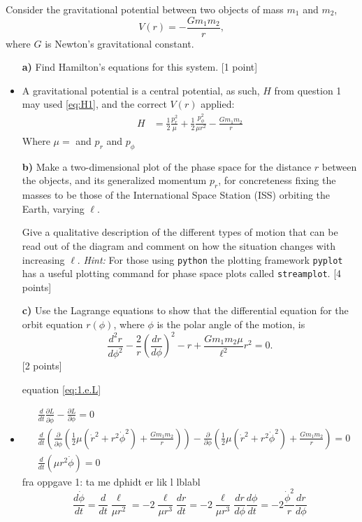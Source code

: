 \documentclass[11pt,a4paper]{report}
\newcounter{excount}[chapter]
\newenvironment{exercise}[1][]{\addtocounter{excount}{1} \noindent {\bf Question
    \arabic{excount} \ \ #1}\hspace{2mm}}{\vspace{4mm}}
\begin{document}
\begin{exercise}{\bf Orbital motion\\}
Consider the gravitational potential between two objects of mass $m_1$ and $m_2$,
\begin{equation}
V(r)=-\frac{Gm_1m_2}{r},\label{eq:grav_pot}
\end{equation}
where $G$ is Newton's gravitational constant.
\begin{itemize}
\item[{\bf a)}] Find Hamilton's equations for this system. [1 point]
\item A gravitational potential is a central potential, as such, $H$ from question 1 may used \eqref{eq:H1}, and the correct $V(r)$ applied:
\begin{align}
H &=  \frac{1}{2} \frac{p_r^2}{\mu}  +\frac{1}{2}\frac{p_\phi^2}{\mu r^2}  -\frac{Gm_1m_2}{r}
\label{eq:2.a.H}
\end{align}
Where $\mu=$ and $p_r$ and $p_\phi$
 \item[{\bf b)}] Make a two-dimensional plot of the phase space for the distance $r$ between the objects, and its generalized momentum $p_r$, for concreteness fixing the masses to be those of the International Space Station (ISS) orbiting the Earth, varying $\ell$.

Give a qualitative description of the different types of motion that can be read out of the diagram and comment on how the situation changes with increasing $\ell$. {\it Hint:} For those using {\tt python} the plotting framework {\tt pyplot} has a useful plotting command for phase space plots called {\tt streamplot}.  [4 points]
\item[{\bf c)}] Use the Lagrange equations to show that the differential equation for the orbit equation $r(\phi)$, where $\phi$ is the polar angle of the motion, is
\begin{equation}
\frac{d^2r}{d\phi^2}-\frac{2}{ r}\left(\frac{dr}{d\phi}\right)^2-r+\frac{Gm_1m_2\mu }{\ell^2}r^2=0. \label{eq:2c.diffeq}
\end{equation}
[2 points]

equation \eqref{eq:1.e.L}
\item \begin{align}
&\frac{d}{dt}\frac{\partial L}{\partial \dot{\phi}}-\frac{\partial L}{\partial \phi}=0 \\
&\frac{d}{dt} \left( \frac{\partial }{\partial \dot{\phi}} \left( \frac{1}{2}\mu (\dot{r}^2+r^2\dot{\phi}^2)+\frac{Gm_1m_2}{r} \right) \right) -\frac{\partial }{\partial \phi} \left( \frac{1}{2}\mu (\dot{r}^2+r^2\dot{\phi}^2)+\frac{Gm_1m_2}{r} \right)=0\\
&\frac{d}{dt} \left( \mu r^2\dot{\phi} \right)=0
\end{align} 
fra oppgave 1:
ta me dphidt er lik l lblabl
\begin{equation}
\frac{d \dot{\phi}}{dt}= \frac{d}{dt} \frac{\ell}{\mu r^2}=-2\frac{\ell}{\mu r^3}\frac{dr}{dt}=-2\frac{\ell}{\mu r^3}\frac{dr}{d\phi}\frac{d\phi}{dt}=-2 \frac{\dot{\phi}^2}{r} \frac{dr}{d\phi}
\end{equation}


\end{itemize}
\end{exercise}
\end{document}
